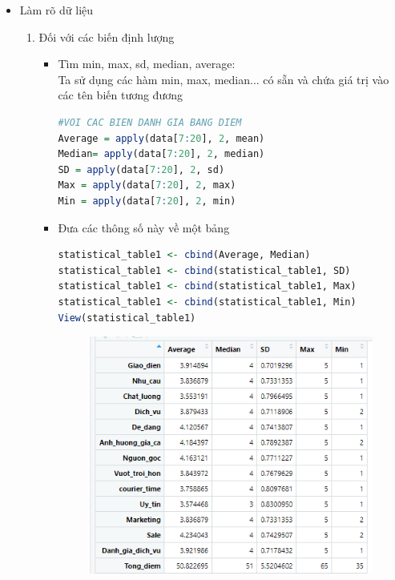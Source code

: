 \documentclass[a4paper]{article}
\theoremstyle{definition}
\begin{document}
\begin{itemize}
\begin{itemize}
\begin{enumerate}
\end{enumerate}
\item Làm rõ dữ liệu
\begin{enumerate}
\item Đối với các biến định lượng\\
\begin{itemize}
    \item Tìm min, max, sd, median, average:\\
    Ta sử dụng các hàm min, max, median... có sẵn  và chứa giá trị vào các tên biến tương đương\\
\begin{lstlisting}[language=R, caption=Làm rõ dữ liệu]
#VOI CAC BIEN DANH GIA BANG DIEM
Average = apply(data[7:20], 2, mean)
Median= apply(data[7:20], 2, median)
SD = apply(data[7:20], 2, sd)
Max = apply(data[7:20], 2, max)
Min = apply(data[7:20], 2, min)
\end{lstlisting}
\item Đưa các thông số này về một bảng\\
\begin{lstlisting}[language=R, caption=Làm rõ dữ liệu (tiếp theo)]
statistical_table1 <- cbind(Average, Median)
statistical_table1 <- cbind(statistical_table1, SD)
statistical_table1 <- cbind(statistical_table1, Max)
statistical_table1 <- cbind(statistical_table1, Min)
View(statistical_table1)
\end{lstlisting}
        \begin{figure}[H]
            \centering
            \includegraphics[scale=0.8]{rieng_3.png}
            \label{fig:my_label}
        \end{figure}

\end{itemize}
\end{enumerate}
\end{itemize}
\end{itemize}
\end{document}
